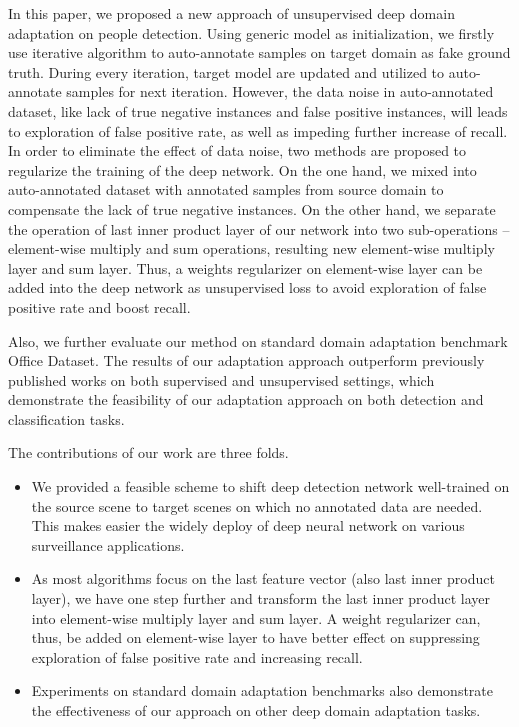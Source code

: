 \documentclass[runningheads]{llncs}
\begin{document}
In this paper, we proposed a new approach of unsupervised deep domain adaptation on people detection. Using generic model as initialization, we firstly use iterative algorithm to auto-annotate samples on target domain as fake ground truth. During every iteration, target model are updated and utilized to auto-annotate samples for next iteration. However, the data noise in auto-annotated dataset, like lack of true negative instances and false positive instances, will leads to exploration of false positive rate, as well as impeding further increase of recall. In order to eliminate the effect of data noise, two methods are proposed to regularize the training of the deep network. On the one hand, we mixed into auto-annotated dataset with annotated samples from source domain to compensate the lack of true negative instances. On the other hand, we separate the operation of last inner product layer of our network into two sub-operations -- element-wise multiply and sum operations, resulting new element-wise multiply layer and sum layer. Thus, a weights regularizer on element-wise layer can be added into the deep network as unsupervised loss to avoid exploration of false positive rate and boost recall.

Also, we further evaluate our method on standard domain adaptation benchmark Office Dataset. The results of our adaptation approach outperform previously published works on both supervised and unsupervised settings, which demonstrate the feasibility of our adaptation approach on both detection and classification tasks.
\par
The contributions of our work are three folds.
\begin{itemize}
\item We provided a feasible scheme to shift deep detection network well-trained on the source scene to target scenes on which no annotated data are needed. This makes easier the widely deploy of deep neural network on various surveillance applications.
\item As most algorithms focus on the last feature vector (also last inner product layer), we have one step further and transform the last inner product layer into element-wise multiply layer and sum layer. A weight regularizer can, thus, be added on element-wise layer to have better effect on suppressing exploration of false positive rate and increasing recall.
\item Experiments on standard domain adaptation benchmarks also demonstrate the effectiveness of our approach on other deep domain adaptation tasks.
\end{itemize}
\end{document}

